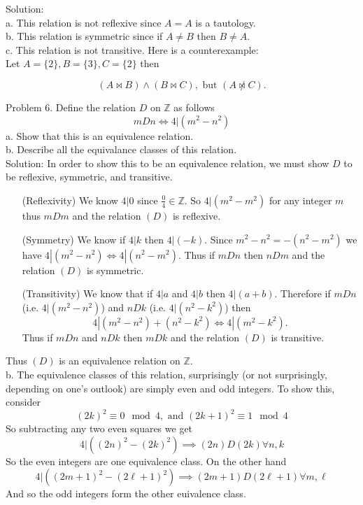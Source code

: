 \documentclass[16 pt]{amsart}
\theoremstyle{definition}
\theoremstyle{remark}
\numberwithin{equation}{subsection}
\newcommand{\Z}{\mathbb{Z}}
\begin{document}
Solution:\\
a. This relation is not reflexive since $A=A$ is a tautology.\\
b. This relation is symmetric since if $A\neq B$ then $B\neq A$.\\
c. This relation is not transitive.  Here is a counterexample:\\
Let $A=\{2\}, B=\{3\}, C= \{2\}$ then

\[
(A \bowtie B) \wedge (B \bowtie C), \text{ but } (A \not\bowtie C).
\]

\newpage
Problem 6. Define the relation $D$ on $\Z$ as follows
\[
m D n \Longleftrightarrow 4 | (m^2-n^2)
\]
a. Show that this is an equivalence relation.\\
b. Describe all the equivalance classes of this relation.\\


Solution: In order to show this to be an equivalence relation, we must show $D$ to be reflexive, symmetric, and transitive.
\begin{enumerate}
\item[(Reflexivity)] We know $4|0$ since $\frac{0}{4}\in\Z$.  So $4|(m^2-m^2)$ for any integer $m$ thus $mDm$ and the relation $(D)$ is reflexive.\\
\item[(Symmetry)] We know if $4|k$ then $4|(-k)$.  Since $m^2-n^2 = -(n^2-m^2)$ we have $4|(m^2-n^2) \Longleftrightarrow 4|(n^2-m^2)$.  Thus if $mDn$ then $nDm$ and the relation $(D)$ is symmetric.\\
\item[(Transitivity)] We know that if $4|a$ and $4|b$ then $4|(a+b)$.  Therefore if $mDn$ (i.e. $4|(m^2-n^2)$) and $nDk$ (i.e. $4|(n^2-k^2)$) then
\[
4| (m^2-n^2)+(n^2-k^2) \Longleftrightarrow 4|(m^2-k^2).
\]
Thus if $mDn$ and $nDk$ then $mDk$ and the relation $(D)$ is transitive.
\end{enumerate}
Thus $(D)$ is an equivalence relation on $\Z$.\\

b. The equivalence classes of this relation, surprisingly (or not surprisingly, depending on one's outlook) are simply even and odd integers.  To show this, consider
\[
(2k)^2 \equiv 0 \mod{4}, \text{ and } (2k+1)^2 \equiv 1 \mod{4}
\]
So subtracting any two even squares we get
\[
4|((2n)^2-(2k)^2) \implies (2n)D(2k) \forall n,k
\]
So the even integers are one equivalence class.  On the other hand 
\[
4|((2m+1)^2-(2\ell+1)^2) \implies (2m+1)D(2\ell+1) \forall m,\ell
\]
And so the odd integers form the other euivalence class.
\end{document}
